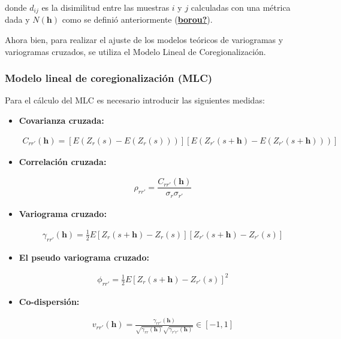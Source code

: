 \documentclass[
]{book}
\begin{document}
donde \(d_{ij}\) es la disimilitud entre las muestras \(i\) y \(j\) calculadas con una métrica dada y \(N(\textbf{h})\) como se definió anteriormente (\protect\hyperlink{ref-borou}{\textbf{borou?}}).

Ahora bien, para realizar el ajuste de los modelos teóricos de variogramas y variogramas cruzados, se utiliza el Modelo Lineal de Coregionalización.

\hypertarget{modelo-lineal-de-coregionalizaciuxf3n-mlc}{%
\subsubsection*{Modelo lineal de coregionalización (MLC)}\label{modelo-lineal-de-coregionalizaciuxf3n-mlc}}

Para el cálculo del MLC es necesario introducir las siguientes medidas:

\begin{itemize}
\item
  \textbf{Covarianza cruzada:}

  \begin{align}
        C_{rr'}(\textbf{h})=\left[E(Z_r(s)-E(Z_r(s))) \right]\left[E(Z_{r'}(s+\textbf{h})-E(Z_{r'}(s+\textbf{h}))) \right]
    \end{align}
\item
  \textbf{Correlación cruzada:}

  \begin{align}
        \rho_{rr'}=\dfrac{C_{rr'}(\textbf{h})}{\sigma_r \sigma_{r'}}
    \end{align}
\item
  \textbf{Variograma cruzado:}

  \begin{align}
        \gamma_{rr'}(\textbf{h})=\frac{1}{2}E\left[Z_r(s+\textbf{h})-Z_r(s) \right]\left[ Z_{r'}(s+\textbf{h})-Z_{r'}(s)\right]
    \end{align}
\item
  \textbf{El pseudo variograma cruzado:}

  \begin{align}
        \phi_{rr'}=\frac{1}{2}E\left[Z_r(s+\textbf{h})-Z_{r'}(s) \right]^2
    \end{align}
\item
  \textbf{Co-dispersión:}

  \begin{align}
        v_{rr'}(\textbf{h})=\frac{\gamma_{rr'}(\textbf{h})}{\sqrt{\gamma_{rr}(\textbf{h})}\sqrt{\gamma_{r'r'}(\textbf{h})} } \in [-1,1]
    \end{align}
\end{itemize}
\end{document}
